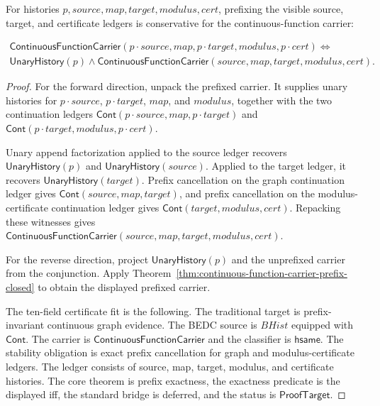 \begin{theorem}
\label{thm:continuous-function-carrier-prefix-iff}
For histories $p,source,map,target,modulus,cert$, prefixing the visible source,
target, and certificate ledgers is conservative for the continuous-function
carrier:

$$
\begin{array}{l}
\mathsf{ContinuousFunctionCarrier}(p\cdot source,map,p\cdot target,modulus,p\cdot cert)
\Longleftrightarrow
\\
\mathsf{UnaryHistory}(p)\wedge
\mathsf{ContinuousFunctionCarrier}(source,map,target,modulus,cert).
\end{array}
$$
\end{theorem}
\begin{proof}
For the forward direction, unpack the prefixed carrier. It supplies unary
histories for $p\cdot source$, $p\cdot target$, $map$, and $modulus$, together
with the two continuation ledgers
$\mathsf{Cont}(p\cdot source,map,p\cdot target)$ and
$\mathsf{Cont}(p\cdot target,modulus,p\cdot cert)$.

Unary append factorization applied to the source ledger recovers
$\mathsf{UnaryHistory}(p)$ and $\mathsf{UnaryHistory}(source)$. Applied to the
target ledger, it recovers $\mathsf{UnaryHistory}(target)$. Prefix cancellation
on the graph continuation ledger gives $\mathsf{Cont}(source,map,target)$, and
prefix cancellation on the modulus-certificate continuation ledger gives
$\mathsf{Cont}(target,modulus,cert)$. Repacking these witnesses gives
$\mathsf{ContinuousFunctionCarrier}(source,map,target,modulus,cert)$.

For the reverse direction, project $\mathsf{UnaryHistory}(p)$ and the
unprefixed carrier from the conjunction. Apply
Theorem~\ref{thm:continuous-function-carrier-prefix-closed} to obtain the
displayed prefixed carrier.

The ten-field certificate fit is the following. The traditional target is
prefix-invariant continuous graph evidence. The BEDC source is $BHist$ equipped
with $\mathsf{Cont}$. The carrier is $\mathsf{ContinuousFunctionCarrier}$ and
the classifier is $\mathsf{hsame}$. The stability obligation is exact prefix
cancellation for graph and modulus-certificate ledgers. The ledger consists of
source, map, target, modulus, and certificate histories. The core theorem is
prefix exactness, the exactness predicate is the displayed iff, the standard
bridge is deferred, and the status is $\mathsf{ProofTarget}$.
\end{proof}

